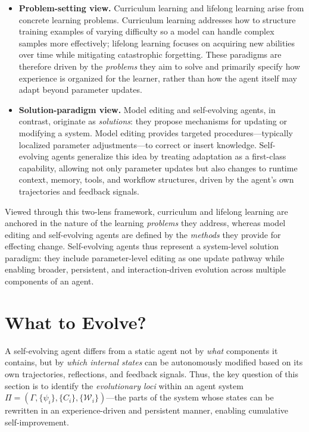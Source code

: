 \documentclass[10pt]{article} %
\begin{document}
\begin{itemize}


\item \textbf{Problem-setting view.}
Curriculum learning and lifelong learning arise from concrete learning problems. Curriculum learning addresses how to structure training examples of varying difficulty so a model can handle complex samples more effectively; lifelong learning focuses on acquiring new abilities over time while mitigating catastrophic forgetting. These paradigms are therefore driven by the \emph{problems} they aim to solve and primarily specify how experience is organized for the learner, rather than how the agent itself may adapt beyond parameter updates.

\item \textbf{Solution-paradigm view.}
Model editing and self-evolving agents, in contrast, originate as \emph{solutions}: they propose mechanisms for updating or modifying a system. Model editing provides targeted procedures—typically localized parameter adjustments—to correct or insert knowledge. Self-evolving agents generalize this idea by treating adaptation as a first-class capability, allowing not only parameter updates but also changes to runtime context, memory, tools, and workflow structures, driven by the agent’s own trajectories and feedback signals.

\end{itemize}

Viewed through this two-lens framework, curriculum and lifelong learning are anchored in the nature of the learning \emph{problems} they address, whereas model editing and self-evolving agents are defined by the \emph{methods} they provide for effecting change. Self-evolving agents thus represent a system-level solution paradigm: they include parameter-level editing as one update pathway while enabling broader, persistent, and interaction-driven evolution across multiple components of an agent.








\section{What to Evolve?}
\label{sec:what}

A self-evolving agent differs from a static agent not by \emph{what} components it contains,
but by \emph{which internal states} can be autonomously modified based on its own
trajectories, reflections, and feedback signals.  
Thus, the key question of this section is to identify the \textit{evolutionary loci} within an
agent system $\Pi = (\Gamma, \{\psi_i\}, \{C_i\}, \{\mathcal{W}_i\})$—the parts of the system whose
states can be rewritten in an experience-driven and persistent manner, enabling cumulative self-improvement.
\end{document}
